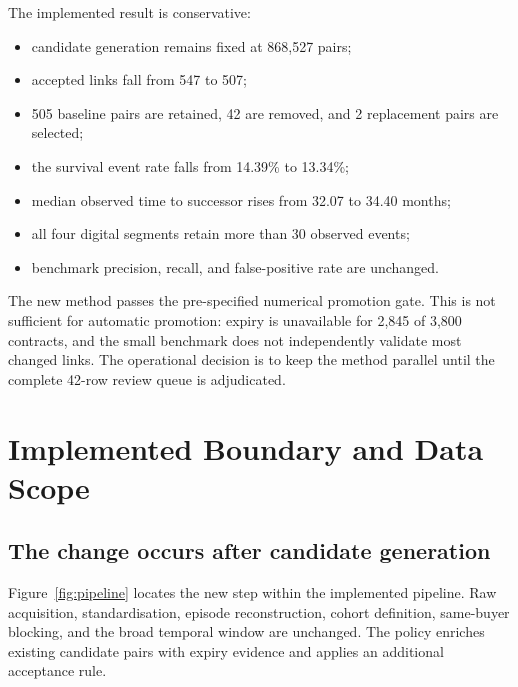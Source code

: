 \documentclass[11pt,a4paper]{article}
\begin{document}
The implemented result is conservative:

\begin{itemize}
  \item candidate generation remains fixed at 868,527 pairs;
  \item accepted links fall from 547 to 507;
  \item 505 baseline pairs are retained, 42 are removed, and 2 replacement pairs are selected;
  \item the survival event rate falls from 14.39\% to 13.34\%;
  \item median observed time to successor rises from 32.07 to 34.40 months;
  \item all four digital segments retain more than 30 observed events;
  \item benchmark precision, recall, and false-positive rate are unchanged.
\end{itemize}

The new method passes the pre-specified numerical promotion gate. This is not
sufficient for automatic promotion: expiry is unavailable for 2,845 of 3,800
contracts, and the small benchmark does not independently validate most changed
links. The operational decision is to keep the method parallel until the complete
42-row review queue is adjudicated.

\section{Implemented Boundary and Data Scope}

\subsection{The change occurs after candidate generation}

Figure~\ref{fig:pipeline} locates the new step within the implemented pipeline. Raw
acquisition, standardisation, episode reconstruction, cohort definition, same-buyer
blocking, and the broad temporal window are unchanged. The policy enriches existing
candidate pairs with expiry evidence and applies an additional acceptance rule.
\end{document}
